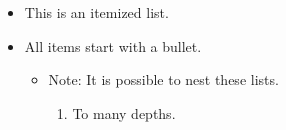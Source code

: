 \documentclass{IEEEtran}
\begin{document}
\begin{itemize}
\item This is an itemized list.
\item All items start with a bullet.
\begin{itemize}
\item Note:  It is possible to nest these lists.
\begin{enumerate}
\item To many depths.
\end{enumerate}
\end{itemize}
\end{itemize}




\end{document}
